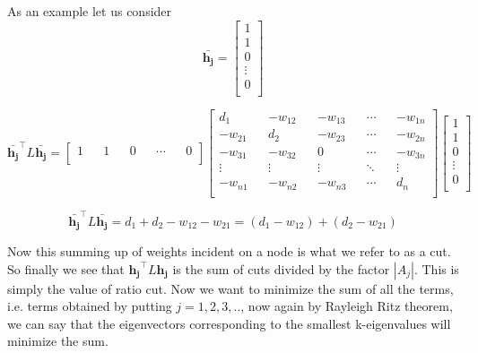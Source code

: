 \documentclass[english]{article}
\theoremstyle{plain}
\begin{document}
As an example let us consider
\begin{equation}
\bar{\boldsymbol{h_{j}}} = 
\begin{bmatrix}
1 \\
1 \\
0 \\
\vdots \\
0 \\
\end{bmatrix}
\end{equation}

\begin{equation}
\bar{\boldsymbol{h_{j}}}^{\top}L\bar{\boldsymbol{h_{j}}} =
\begin{bmatrix}
1 && 1 && 0 && \cdots && 0 \\
\end{bmatrix}
\begin{bmatrix}
d_{1} && -w_{12} && -w_{13} && \cdots && -w_{1n} \\
-w_{21} && d_{2} && -w_{23} && \cdots && -w_{2n} \\
-w_{31} && -w_{32} && 0 && \cdots && -w_{3n} \\
\vdots && \vdots && \vdots && \ddots && \vdots \\
-w_{n1} && -w_{n2} && -w_{n3} && \cdots && d_{n} \\
\end{bmatrix}
\begin{bmatrix}
1 \\
1 \\
0 \\
\vdots \\
0 \\
\end{bmatrix}
\end{equation}

\begin{equation}
\bar{\boldsymbol{h_{j}}}^{\top}L\bar{\boldsymbol{h_{j}}} = d_{1} + d_{2} - w_{12} - w_{21} = (d_{1}-w_{12}) + (d_{2}-w_{21})
\end{equation}

Now this summing up of weights incident on a node is what we refer to as a cut. So finally we see that $\boldsymbol{h_{j}}^{\top}L\boldsymbol{h_{j}}$ is the sum of cuts divided by the factor $\left|A_{j}\right|$. This is simply the value of ratio cut.
Now we want to minimize the sum of all the terms, i.e. terms obtained by putting $j=1,2,3,..$, now again by Rayleigh Ritz theorem, we can say that the eigenvectors corresponding to the smallest k-eigenvalues will minimize the sum.
\end{document}
